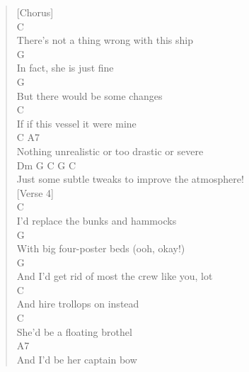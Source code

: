 \documentclass[11pt]{article}
\begin{document}
\begin{verse}
\vspace*{1em}
\vspace*{1em}
[Chorus]\\
\vspace*{1em}
\hspace*{1em}C\\
There's not a thing wrong with this ship\\
\hspace*{1em}G\\
In fact, she is just fine\\
\hspace*{1em}G\\
But there would be some changes\\
\hspace*{1em}C\\
If if this vessel it were mine\\
\hspace*{1em}C                           A7\\
Nothing unrealistic or too drastic or severe\\
\hspace*{1em}Dm                G             C         G       C\\
Just some subtle tweaks to improve the atmosphere!\\
\vspace*{1em}
\vspace*{1em}
[Verse 4]\\
\vspace*{1em}
\hspace*{6em}C\\
I'd replace the bunks and hammocks\\
\hspace*{6em}G\\
With big four-poster beds (ooh, okay!)\\
\hspace*{6em}G\\
And I'd get rid of most the crew like you, lot\\
\hspace*{5em}C\\
And hire trollops on instead\\
\hspace*{6em}C\\
She'd be a floating brothel\\
\hspace*{7em}A7\\
And I'd be her captain bow\\

\end{verse}
\end{document}
